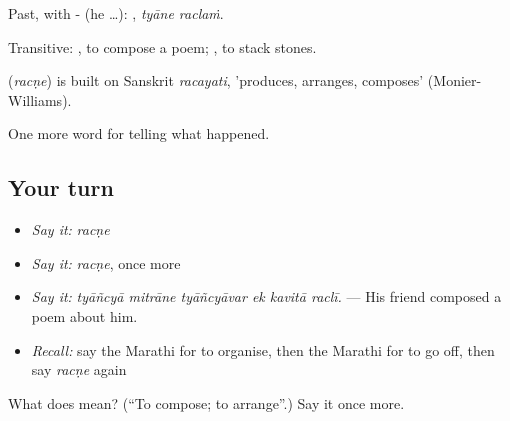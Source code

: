 Past, with - (he …):  , \emph{tyāne raclaṁ}.

Transitive:  , to compose a poem;  , to stack stones.

\begin{cousinweb}
\textbf{} (\emph{racṇe}) is built on Sanskrit \emph{racayati}, 'produces, arranges, composes' (Monier-Williams).
\end{cousinweb}

\begin{grammarlens}[title={What you've built}]
One more word for telling what happened.
\end{grammarlens}

\subsection*{Your turn}
\begin{itemize}
\raggedright
  \item \emph{Say it:} \emph{racṇe}
  \item \emph{Say it:} \emph{racṇe}, once more
  \item \emph{Say it:} \emph{tyāñcyā mitrāne tyāñcyāvar ek kavitā raclī.} — His friend composed a poem about him.
  \item \emph{Recall:} say the Marathi for to organise, then the Marathi for to go off, then say \emph{racṇe} again
\end{itemize}

\begin{tcolorbox}[breakable,colback=teal!4,colframe=teal!35!black,title={Before you move on}]
What does  mean? (\textquotedblleft{}To compose; to arrange\textquotedblright{}.) Say it once more.
\end{tcolorbox}
